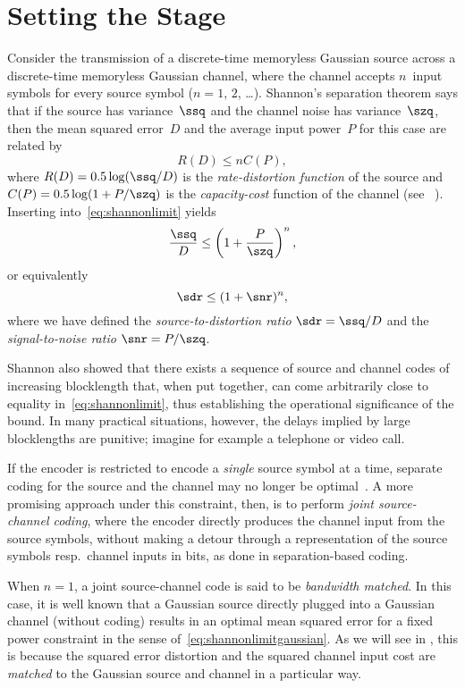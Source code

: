 \chapter{Setting the Stage}

Consider the transmission of a discrete-time memoryless Gaussian source across a
discrete-time memoryless Gaussian channel, where the channel accepts $n$~input
symbols for every source symbol ($n = 1$, $2$, \ldots). Shannon's separation
theorem says that if the source has variance~$\ssq$ and the channel noise has
variance~$\szq$, then the mean squared error~$D$ and the average input power~$P$
for this case are related by
\begin{equation}
  \label{eq:shannonlimit}
  R(D) \le n C(P),
\end{equation}
where $R(D) = 0.5 \log(\ssq/D)$ is the \emph{rate-distortion function} of the
source and $C(P) = 0.5 \log(1 + P/\szq)$ is the \emph{capacity-cost} function of
the channel (see \eg~\cite{CoverT1991}). Inserting into~\eqref{eq:shannonlimit}
yields
\begin{equation}
  \label{eq:shannonlimitgaussian}
  \frac{\ssq}{D} \le \left( 1 + \frac{P}{\szq} \right)^n,
\end{equation}
or equivalently
\begin{equation}
  \label{eq:shannonlimitsdr}
  \sdr \le (1 + \snr)^n,
\end{equation}
where we have defined the \emph{source-to-distortion ratio} $\sdr = \ssq /D$ and
the \emph{signal-to-noise ratio} $\snr = P/\szq$.

Shannon also showed that there exists a sequence of source and channel codes of
increasing blocklength that, when put together, can come arbitrarily close to
equality in~\eqref{eq:shannonlimit}, thus establishing the operational
significance of the bound. In many practical situations, however, the delays
implied by large blocklengths are punitive; imagine for example a telephone or
video call.

If the encoder is restricted to encode a \emph{single} source symbol at a time,
separate coding for the source and the channel may no longer be
optimal~\cite{ViterbiO2009}. A more promising approach under this constraint,
then, is to perform \emph{joint source-channel coding}, where the encoder
directly produces the channel input from the source symbols, without making a
detour through a representation of the source symbols resp.\ channel inputs in
bits, as done in separation-based coding.

When $n=1$, a joint source-channel code is said to be \emph{bandwidth matched}.
In this case, it is well known that a Gaussian source directly plugged into a
Gaussian channel (without coding) results in an optimal mean squared error for a
fixed power constraint in the sense of~\eqref{eq:shannonlimitgaussian}. As we
will see in , this is because the squared error distortion and
the squared channel input cost are \emph{matched} to the Gaussian source and
channel in a particular way. 

